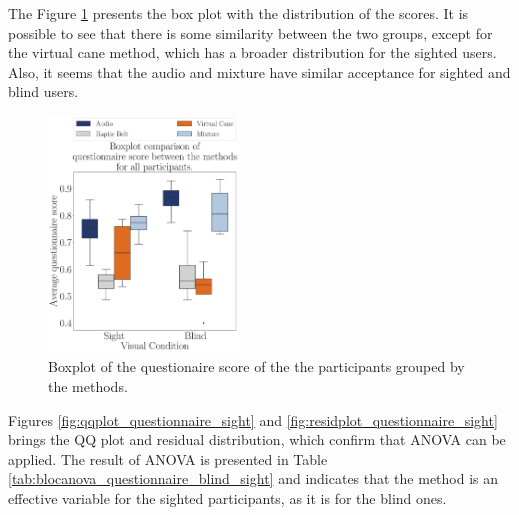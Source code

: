 The Figure \ref{fig:boxplot_questionnaire_scene} presents the box plot with the distribution of the scores. It is possible to see that there is some similarity between the two groups, except for the virtual cane method, which has a broader distribution for the sighted users. Also, it seems that the audio and mixture have similar acceptance for sighted and blind users.

\begin{figure}[!htb]
    \centering
    \includegraphics[width = 0.45\textwidth]{Resultados/Questionario/Figuras/pdf/boxplot_questionnaire_scene.pdf}
    \caption{Boxplot of the questionaire score of the the participants grouped by the methods.}
    \label{fig:boxplot_questionnaire_scene}
\end{figure}

%
%
%

Figures \ref{fig:qqplot_questionnaire_sight} and \ref{fig:residplot_questionnaire_sight} brings the QQ plot and residual distribution, which confirm that ANOVA can be applied. The result of ANOVA is presented in Table \ref{tab:blocanova_questionnaire_blind_sight} and indicates that the method is an effective variable for the sighted participants, as it is for the blind ones.


